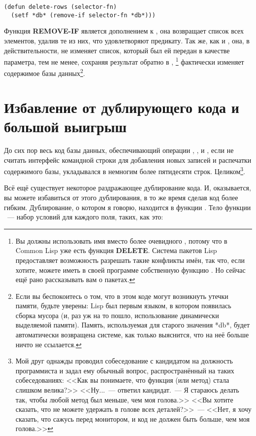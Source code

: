 \begin{lstlisting}
(defun delete-rows (selector-fn)
  (setf *db* (remove-if selector-fn *db*)))
\end{lstlisting}

Функция \textbf{REMOVE-IF} является дополнением к , она возвращает
список всех элементов, удалив те из них, что удовлетворяют предикату. Так же, как и
, она, в действительности, не изменяет список, который был ей передан
в качестве параметра, тем не менее, сохраняя результат обратно в ,
\footnote{Вы должны использовать имя  вместо более
  очевидного , потому что в Common Lisp уже есть функция
  \textbf{DELETE}. Система пакетов Lisp предоставляет возможность разрешать такие
  конфликты имён, так что, если хотите, можете иметь в своей программе собственную функцию
  . Но сейчас ещё рано рассказывать вам о пакетах.} фактически изменяет
содержимое базы данных\footnote{Если вы беспокоитесь о том, что в этом коде могут
  возникнуть утечки памяти, будьте уверены: Lisp был первым языком, в котором появилась
  сборка мусора (и, раз уж на то пошло, использование динамически выделяемой
  памяти). Память, используемая для старого значения *db*, будет автоматически возвращена
  системе, как только выяснится, что на неё больше ничто не ссылается.}.

\section{Избавление от дублирующего кода и большой выигрыш}

До сих пор весь код базы данных, обеспечивающий операции , ,
 и , если не считать интерфейс командной строки для добавления
новых записей и распечатки содержимого базы, укладывался в немногим более пятидесяти
строк. Целиком\footnote{Мой друг однажды проводил собеседование с кандидатом на должность
  программиста и задал ему обычный вопрос, распространённый на таких собеседованиях: <<Как
  вы понимаете, что функция (или метод) стала слишком велика?>> <<Ну...~--- ответил
  кандидат.~--- Я стараюсь делать так, чтобы любой метод был меньше, чем моя голова.>>  <<Вы
  хотите сказать, что не можете удержать в голове всех деталей?>>~--- <<Нет, я хочу сказать,
  что сажусь перед монитором, и код не должен быть больше, чем моя голова.>>}.

Всё ещё существует некоторое раздражающее дублирование кода. И, оказывается, вы можете
избавиться от этого дублирования, в то же время сделав код более гибким. Дублирование, о
котором я говорю, находится в функции . Тело функции ~--- набор
условий для каждого поля, таких, как это:

